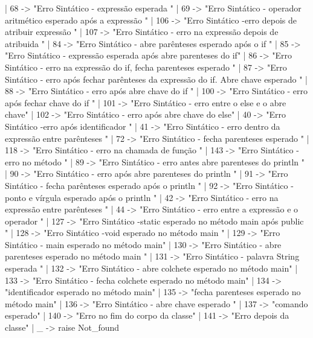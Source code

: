 \documentclass[12pt,a4paper,twoside]{report}
\begin{document}
\begin{terminal}
    | 68 ->
        "Erro Sintático - expressão esperada \n"
    | 69 ->
        "Erro Sintático - operador aritmético esperado após a expressão \n"
    | 106 ->
        "Erro Sintático -erro depois de atribuir expressão \n"
    | 107 ->
        "Erro Sintático - erro na expressão depois de atribuida \n"
    | 84 ->
        "Erro Sintático - abre parênteses esperado após o if \n"
    | 85 ->
        "Erro Sintático - expressão esperada após abre parenteses do if\n"
    | 86 ->
        "Erro Sintático - erro na expressão do if, fecha parenteses esperado \n"
    | 87 ->
        "Erro Sintático - erro após fechar parênteses da expressão do if. Abre chave esperado \n"
    | 88 ->
        "Erro Sintático - erro após abre chave do if \n"
    | 100 ->
        "Erro Sintático - erro após fechar chave do if \n"
    | 101 ->
        "Erro Sintático - erro entre o else e o abre chave\n"
    | 102 ->
        "Erro Sintático - erro após abre chave do else\n"
    | 40 ->
        "Erro Sintático -erro após identificador \n"
    | 41 ->
        "Erro Sintático - erro dentro da expressão entre parênteses \n"
    | 72 ->
        "Erro Sintático - fecha parenteses esperado \n"
    | 118 ->
        "Erro Sintático - erro na chamada de função \n"
    | 143 ->
        "Erro Sintático - erro no método \n"
    | 89 ->
        "Erro Sintático - erro antes abre parenteses do println \n"
    | 90 ->
        "Erro Sintático - erro após abre parenteses do println \n"
    | 91 ->
        "Erro Sintático - fecha parênteses  esperado após o println  \n"
    | 92 ->
        "Erro Sintático - ponto e vírgula esperado após o println \n"
    | 42 ->
        "Erro Sintático - erro na expressão entre parênteses \n"
    | 44 ->
        "Erro Sintático - erro entre a expressão e o operador \n"
    | 127 ->
        "Erro Sintático -static esperado no método main após public \n"
    | 128 ->
        "Erro Sintático -void esperado no método main \n"
    | 129 ->
        "Erro Sintático - main esperado no método main\n"
    | 130 ->
        "Erro Sintático - abre parenteses esperado no método main \n"
    | 131 ->
        "Erro Sintático - palavra String esperada \n"
    | 132 ->
        "Erro Sintático - abre colchete esperado no método main\n"
    | 133 ->
        "Erro Sintático - fecha colchete esperado no método main\n"
    | 134 ->
        "identificador esperado no método main"
    | 135 ->
        "fecha parenteses esperado no método main"
    | 136 ->
        "Erro Sintático - abre chave esperado \n"
    | 137 ->
        "comando esperado"
    | 140 ->
        "Erro no fim do corpo da classe\n"
    | 141 ->
        "Erro depois da classe\n"
    | _ ->
        raise Not_found


\end{terminal}
\end{document}
